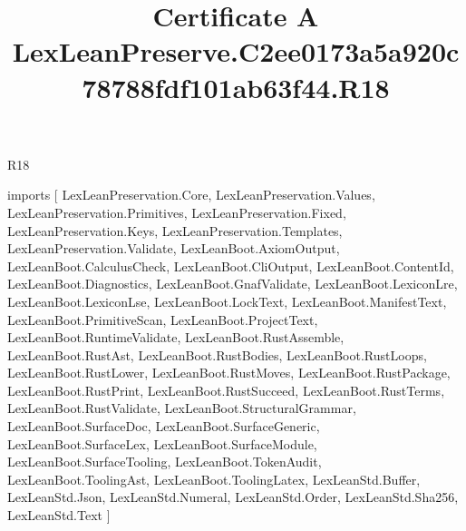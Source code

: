 \begin{lexlean}{R18}
\title{Certificate A LexLeanPreserve.C2ee0173a5a920c78788fdf101ab63f44.R18}
\begin{coremodule}
imports [
  LexLeanPreservation.Core,
  LexLeanPreservation.Values,
  LexLeanPreservation.Primitives,
  LexLeanPreservation.Fixed,
  LexLeanPreservation.Keys,
  LexLeanPreservation.Templates,
  LexLeanPreservation.Validate,
  LexLeanBoot.AxiomOutput,
  LexLeanBoot.CalculusCheck,
  LexLeanBoot.CliOutput,
  LexLeanBoot.ContentId,
  LexLeanBoot.Diagnostics,
  LexLeanBoot.GnafValidate,
  LexLeanBoot.LexiconLre,
  LexLeanBoot.LexiconLse,
  LexLeanBoot.LockText,
  LexLeanBoot.ManifestText,
  LexLeanBoot.PrimitiveScan,
  LexLeanBoot.ProjectText,
  LexLeanBoot.RuntimeValidate,
  LexLeanBoot.RustAssemble,
  LexLeanBoot.RustAst,
  LexLeanBoot.RustBodies,
  LexLeanBoot.RustLoops,
  LexLeanBoot.RustLower,
  LexLeanBoot.RustMoves,
  LexLeanBoot.RustPackage,
  LexLeanBoot.RustPrint,
  LexLeanBoot.RustSucceed,
  LexLeanBoot.RustTerms,
  LexLeanBoot.RustValidate,
  LexLeanBoot.StructuralGrammar,
  LexLeanBoot.SurfaceDoc,
  LexLeanBoot.SurfaceGeneric,
  LexLeanBoot.SurfaceLex,
  LexLeanBoot.SurfaceModule,
  LexLeanBoot.SurfaceTooling,
  LexLeanBoot.TokenAudit,
  LexLeanBoot.ToolingAst,
  LexLeanBoot.ToolingLatex,
  LexLeanStd.Buffer,
  LexLeanStd.Json,
  LexLeanStd.Numeral,
  LexLeanStd.Order,
  LexLeanStd.Sha256,
  LexLeanStd.Text
]


\end{coremodule}
\end{lexlean}
